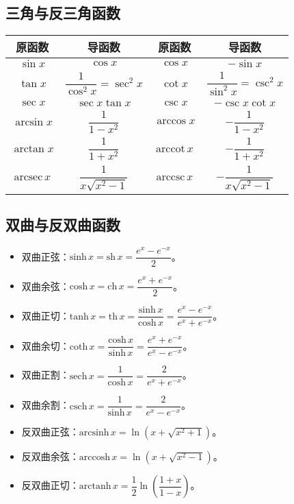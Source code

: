 \documentclass[UTF8, 12pt]{ctexart}
\begin{document}
\subsection{三角与反三角函数}

\begin{center}
    \begin{tabular}{|c|c|c|c|}
        \hline
        原函数 & 导函数 & 原函数 & 导函数\\ \hline
        $\sin x$ & $\cos x$ & $\cos x$ & $-\sin x$ \\ \hline
        $\tan x$ & $\dfrac{1}{\cos^2x}=\sec^2x$ & $\cot x$ & $\dfrac{1}{\sin^2x}=\csc^2x$ \\ \hline
        $\sec x$ & $\sec x\tan x$ & $\csc x$ & $-\csc x\cot x$ \\ \hline
        $\arcsin x$ & $\dfrac{1}{1-x^2}$ & $\arccos x$ & $-\dfrac{1}{1-x^2}$ \\ \hline
        $\arctan x$ & $\dfrac{1}{1+x^2}$ & $\textrm{arccot}\,x$ & $-\dfrac{1}{1+x^2}$ \\ \hline
        $\textrm{arcsec}\,x$ & $\dfrac{1}{x\sqrt{x^2-1}}$ & $\textrm{arccsc}\,x$ & $-\dfrac{1}{x\sqrt{x^2-1}}$ \\ \hline
        \hline
    \end{tabular}
\end{center}

\subsection{双曲与反双曲函数}

\begin{itemize}
    \item 双曲正弦：$\textrm{sinh}\,x=\textrm{sh}\,x=\dfrac{e^{x}-e^{-x}}{2}$。
    \item 双曲余弦：$\textrm{cosh}\,x=\textrm{ch}\,x=\dfrac{e^{x}+e^{-x}}{2}$。
    \item 双曲正切：$\textrm{tanh}\,x=\textrm{th}\,x=\dfrac{\textrm{sinh}\,x}{\textrm{cosh}\,x}=\dfrac{e^{x}-e^{-x}}{e^{x}+e^{-x}}$。
    \item 双曲余切：$\textrm{coth}\,x=\dfrac{\textrm{cosh}\,x}{\textrm{sinh}\,x}=\dfrac{e^{x}+e^{-x}}{e^{x}-e^{-x}}$。
    \item 双曲正割：$\textrm{sech}\,x=\dfrac{1}{\textrm{cosh}\,x}=\dfrac{2}{e^{x}+e^{-x}}$。
    \item 双曲余割：$\textrm{csch}\,x=\dfrac{1}{\textrm{sinh}\,x}=\dfrac{2}{e^{x}-e^{-x}}$。
    \item 反双曲正弦：$\textrm{arcsinh}\,x=\ln\left(x+\sqrt{x^2+1}\right)$。
    \item 反双曲余弦：$\textrm{arccosh}\,x=\ln\left(x+\sqrt{x^2-1}\right)$。
    \item 反双曲正切：$\textrm{arctanh}\,x=\dfrac{1}{2}\ln\left(\dfrac{1+x}{1-x}\right)$。
\end{itemize}
\end{document}
